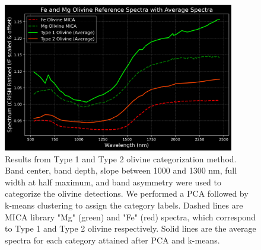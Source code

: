 \documentclass[12pt]{article}
\newenvironment{figurehere}[1][0.85]
  {\begin{figure}[p]
   \begin{minipage}[c][0.80\textheight][c]{\linewidth}
   \centering
   \setlength{\textfloatsep}{0pt}}
  {\end{minipage}
   \end{figure}}
\begin{document}
\begin{figurehere}
    \includegraphics[width=0.9\textwidth]{extended_data/ED5_olivine_cat_spec_fig.png}
    \caption[Results from Type 1 and Type 2 olivine categorization method.]{Results from Type 1 and Type 2 olivine categorization method. Band center, band depth, slope between 1000 and 1300 nm, full width at half maximum, and band asymmetry were used to categorize the olivine detections. We performed a PCA followed by k-means clustering to assign the category labels. Dashed lines are MICA library "Mg" (green) and "Fe" (red) spectra, which correspond to Type 1 and Type 2 olivine respectively. Solid lines are the average spectra for each category attained after PCA and k-means.}
    \label{fig:extended_data_figure5}
\end{figurehere}
\end{document}
